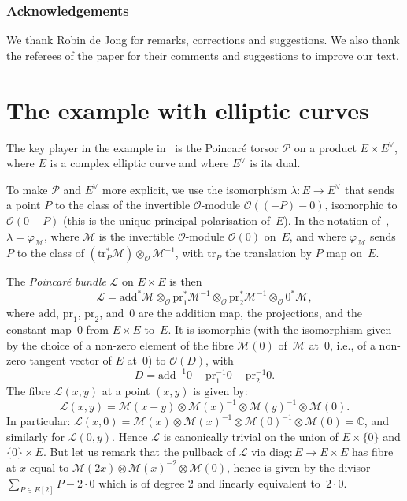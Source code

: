 \documentclass[11pt]{article}
\providecommand{\C}{}
\newcommand{\ie}{i.e.,\xspace}
\let\mathcal\mathscr
\let\oldvee\vee
\renewcommand{\vee}{{\scriptscriptstyle\oldvee}}
\theoremstyle{plain}
\theoremstyle{definition}
\numberwithin{equation}{subsection}
\let\phi\varphi
\renewcommand{\C}{\mathbb C}
\newcommand{\calL}{\mathcal{L}}
\newcommand{\calM}{\mathcal{M}}
\newcommand{\calO}{\mathcal{O}}
\newcommand{\calP}{\mathcal{P}}
\newcommand{\add}{\mathrm{add}}
\newcommand{\diag}{\mathrm{diag}}
\newcommand{\pr}{\mathrm{pr}}
\newcommand{\transl}{\mathrm{tr}}
\begin{document}
\subsubsection*{Acknowledgements}
We thank Robin de Jong for remarks, corrections and suggestions. We
also thank the referees of the paper for their comments and
suggestions to improve our text.

\section{The example with elliptic curves}\label{sec2}
The key player in the example in~\cite{Bertrand11} is the Poincaré
torsor $\calP$ on a product $E\times E^\vee$, where $E$ is a complex
elliptic curve and where $E^\vee$ is its dual.

To make $\calP$ and $E^\vee$ more explicit, we use the isomorphism
$\lambda\colon E \to E^\vee$ that sends a point $P$ to the class of
the invertible $\calO$-module $\calO((-P)-0)$, isomorphic to
$\calO(0-P)$ (this is the unique principal polarisation of~$E$). In
the notation of~\cite[\S 6]{MumfordAV}, $\lambda=\phi_\calM$,
where $\calM$ is the invertible $\calO$-module $\calO(0)$ on~$E$, and
where $\phi_\calM$ sends $P$ to the class of
$(\transl_P^*\calM)\otimes_\calO\calM^{-1}$, with $\transl_P$ the
translation by $P$ map on~$E$.

The \emph{Poincaré bundle} $\calL$ on $E\times E$ is then
\begin{equation}\label{eqn:defPbundle}
\calL =
\add^*\calM\otimes_\calO\pr_1^*\calM^{-1}\otimes_\calO\pr_2^*\calM^{-1}\otimes_\calO0^*\calM,
\end{equation}
where $\add$, $\pr_1$, $\pr_2$, and~$0$ are the addition map, the
projections, and the constant map~$0$ from $E\times E$ to~$E$. It is
isomorphic (with the isomorphism given by the choice of a non-zero
element of the fibre $\calM(0)$ of~$\calM$ at~$0$, \ie of a non-zero
tangent vector of $E$ at~$0$) to $\calO(D)$, with
\begin{equation}\label{eqn:defD}
D=\add^{-1}0-\pr_1^{-1}0-\pr_2^{-1}0.
\end{equation}
The fibre $\calL(x,y)$ at a point $(x,y)$ is given by:
\begin{equation}\label{eqn:fibresPbundle}
\calL(x,y) =
\calM(x+y)\otimes\calM(x)^{-1}\otimes\calM(y)^{-1}\otimes\calM(0).
\end{equation}
In particular:
$\calL(x,0)=\calM(x)\otimes\calM(x)^{-1}\otimes\calM(0)^{-1}\otimes\calM(0)=\C$,
and similarly for $\calL(0,y)$. Hence $\calL$ is canonically trivial on the union of
$E\times\{0\}$ and $\{0\}\times E$. But let us remark that the
pullback of $\calL$ via $\diag\colon E\to E\times E$ has fibre at $x$
equal to $\calM(2x)\otimes\calM(x)^{-2}\otimes\calM(0)$, hence is
given by the divisor $\sum_{P\in E[2]}P - 2{\cdot}0$ which is of degree
2 and linearly equivalent to~$2{\cdot}0$.
\end{document}
